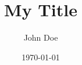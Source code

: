 \documentclass{article}
\title{My Title}
\author{John Doe}
\date{\today}
\begin{document}
\makemytitle
\end{document}
